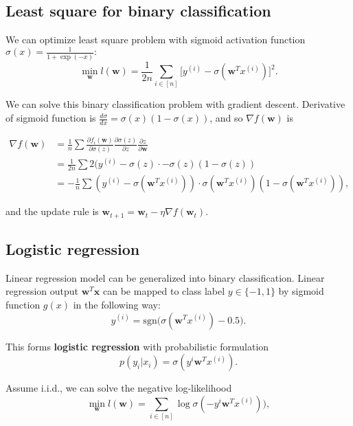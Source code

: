 \documentclass[../main.tex]{subfiles}
\begin{document}
\setlength{\parindent}{0pt}
\subsection{Least square for binary classification}
We can optimize least square problem with sigmoid activation function $\sigma(x)=\frac{1}{1+\exp{(-x)}}:$ $$\min_{\textbf{w}}l(\textbf{w})=\frac{1}{2n}\sum_{i\in[n]}\big[y^{(i)}-\sigma(\textbf{w}^Tx^{(i)})\big]^2.$$ 

We can solve this binary classification problem with gradient descent. Derivative of sigmoid function is $\frac{d\sigma}{dx}=\sigma(x)(1-\sigma(x))$, and so $\nabla f(\textbf{w})$ is

\begin{equation} \label{eq1-4}
\begin{split}
\nabla f(\textbf{w}) & = \frac{1}{n}\sum\frac{\partial f_i(\textbf{w})}{\partial \sigma(z)}\frac{\partial \sigma(z)}{\partial z}\frac{\partial z}{\partial \textbf{w}} \\
 & = \frac{1}{2n} \sum 2(y^{(i)} - \sigma(z)\cdot -\sigma(z)(1 - \sigma(z)) \\
 & = -\frac{1}{n} \sum (y^{(i)}-\sigma(\textbf{w}^Tx^{(i)})) \cdot \sigma(\textbf{w}^Tx^{(i)})(1 - \sigma(\textbf{w}^Tx^{(i)})),
\end{split}
\end{equation}

and the update rule is $\textbf{w}_{t+1}=\textbf{w}_t-\eta\nabla f(\textbf{w}_t)$.

\subsection{Logistic regression}
Linear regression model can be generalized into binary classification. Linear regression output $\textbf{w}^T\textbf{x}$ can be mapped to class label $y\in \{-1, 1\}$ by sigmoid function $g(x)$ in the following way: $$y^{(i)}=\text{sgn}\big(\sigma(\textbf{w}^Tx^{(i)})-0.5\big).$$ 

This forms \textbf{logistic regression} with probabilistic formulation $$p(y_i|x_i)=\sigma(y^{i}\textbf{w}^Tx^{(i)}).$$ 

Assume i.i.d., we can solve the negative log-likelihood $$\min_{\textbf{w}}l(\textbf{w})=\sum_{i\in[n]}\log \sigma(-y^{i}\textbf{w}^Tx^{(i)})), $$
\end{document}
